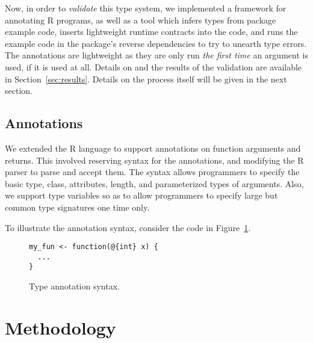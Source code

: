 \documentclass[sigplan,10pt,review,anonymous]{acmart}\settopmatter{printfolios=true,printccs=false,printacmref=false}
\begin{document}
Now, in order to {\it validate} this type system, we implemented a framework for annotating R programs, as well as a tool which infers types from package example code, inserts lightweight runtime contracts into the code, and runs the example code in the package's reverse dependencies to try to unearth type errors.
The annotations are lightweight as they are only run {\it the first time} an argument is used, if it is used at all.
Details on and the results of the validation are available in Section~\ref{sec:results}.
Details on the process itself will be given in the next section.

%
%
%
%
\subsection{Annotations}
\label{subsec:annotations}

We extended the R language to support annotations on function arguments and returns.
This involved reserving syntax for the annotations, and modifying the R parser to parse and accept them.
The syntax allows programmers to specify the basic type, class, attributes, length, and parameterized types of arguments.
Also, we support type variables so as to allow programmers to specify large but common type signatures one time only.

To illustrate the annotation syntax, consider the code in Figure~\ref{fig:annotation-syntax}.

\begin{figure}[!hb]{\small\begin{lstlisting}[style=R]
my_fun <- function(@{int} x) {
  ...
}
\end{lstlisting}}\caption{Type annotation syntax.}\label{fig:annotation-syntax}\end{figure}

%
%
%
%
%
%
\section{Methodology}
\label{sec:methodology}



\end{document}
